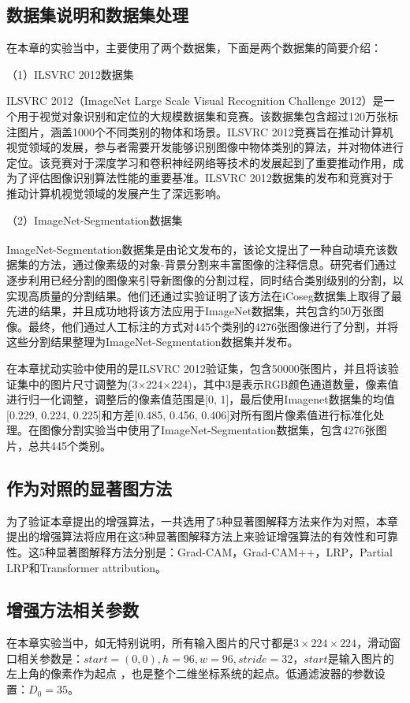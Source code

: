 \subsection{数据集说明和数据集处理}
在本章的实验当中，主要使用了两个数据集，下面是两个数据集的简要介绍：

（1）ILSVRC 2012数据集

ILSVRC 2012（ImageNet Large Scale Visual Recognition Challenge 2012）是一个用于视觉对象识别和定位的大规模数据集和竞赛。该数据集包含超过120万张标注图片，涵盖1000个不同类别的物体和场景。ILSVRC 2012竞赛旨在推动计算机视觉领域的发展，参与者需要开发能够识别图像中物体类别的算法，并对物体进行定位。该竞赛对于深度学习和卷积神经网络等技术的发展起到了重要推动作用，成为了评估图像识别算法性能的重要基准。ILSVRC 2012数据集的发布和竞赛对于推动计算机视觉领域的发展产生了深远影响。

（2）ImageNet-Segmentation数据集

ImageNet-Segmentation数据集是由论文\textsuperscript{\cite{guillaumin2014imagenet}}发布的，该论文提出了一种自动填充该数据集的方法，通过像素级的对象-背景分割来丰富图像的注释信息。研究者们通过逐步利用已经分割的图像来引导新图像的分割过程，同时结合类别级别的分割，以实现高质量的分割结果。他们还通过实验证明了该方法在iCoseg数据集上取得了最先进的结果，并且成功地将该方法应用于ImageNet数据集，共包含约50万张图像。最终，他们通过人工标注的方式对445个类别的4276张图像进行了分割，并将这些分割结果整理为ImageNet-Segmentation数据集并发布。

在本章扰动实验中使用的是ILSVRC 2012验证集，包含50000张图片，并且将该验证集中的图片尺寸调整为(3$\times$224$\times$224)，其中$3$是表示RGB颜色通道数量，像素值进行归一化调整，调整后的像素值范围是[0, 1]，最后使用Imagenet数据集的均值[0.229, 0.224, 0.225]和方差[0.485, 0.456, 0.406]对所有图片像素值进行标准化处理。在图像分割实验当中使用了ImageNet-Segmentation数据集，包含4276张图片，总共445个类别。
\subsection{作为对照的显著图方法}
为了验证本章提出的增强算法，一共选用了5种显著图解释方法来作为对照，本章提出的增强算法将应用在这5种显著图解释方法上来验证增强算法的有效性和可靠性。这5种显著图解释方法分别是：Grad-CAM，Grad-CAM++，LRP，Partial LRP和Transformer attribution。


\subsection{增强方法相关参数}
在本章实验当中，如无特别说明，所有输入图片的尺寸都是$3\times224\times224$，滑动窗口相关参数是：$start=(0,0), h=96, w=96, stride=32$，$start$是输入图片的左上角的像素作为起点 ，也是整个二维坐标系统的起点。低通滤波器的参数设置：$D_0=35$。


